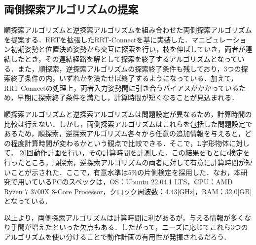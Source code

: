 \documentclass[a4paper,papersize,dvipdfmx]{mtabst}
\begin{document}
\subsection{両側探索アルゴリズムの提案}
順探索アルゴリズムと逆探索アルゴリズムを組み合わせた両側探索アルゴリズムを提案する．RRTを拡張したRRT-Connectを基に実装した．マニピュレーション初期姿勢と位置決め姿勢から交互に探索を行い，枝を伸ばしていき，両者が連結したとき，その連結経路を解として探索を終了するアルゴリズムとなっている．また，順探索，逆探索アルゴリズムの探索終了条件も残しており，3つの探索終了条件の内，いずれかを満たせば終了するようになっている．加えて，RRT-Connectの処理上，両者入力姿勢間に引き合うバイアスがかかっているため，早期に探索終了条件を満たし，計算時間が短くなることが見込まれる．\par
順探索アルゴリズムと逆探索アルゴリズムは問題設定が異なるため，計算時間の比較は行えない．しかし，両側探索アルゴリズムはこれらを包括した問題設定であるため，順探索，逆探索アルゴリズム各々から任意の追加情報を与えると，どの程度計算時間が変わるかという観点で比較できる．そこで，L字形物体に対して，
20回動作計画を行い，その計算時間を計測した．この結果をもとに$t$検定を行ったところ，順探索，逆探索アルゴリズムの両者に対して有意に計算時間が短いことが示された．ここで，有意水準は$5\%$の片側検定を採用した．なお，本研究で用いているPCのスペックは，OS：Ubuntu 22.04.1 LTS，CPU：AMD Ryzen 7 3700X 8-Core Processor，クロック周波数：4.43[GHz]，RAM：32.0[GB]となっている．\par
以上より，両側探索アルゴリズムは計算時間に利があるが，与える情報が多くなり手間が増えたといった欠点もある．したがって，ニーズに応じてこれら3つのアルゴリズムを使い分けることで動作計画の有用性が発揮されるだろう．
\end{document}

